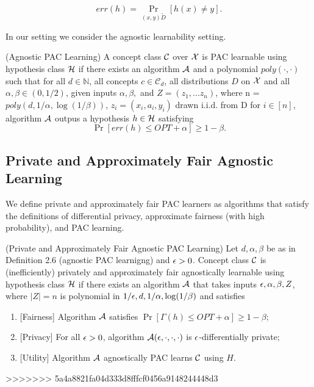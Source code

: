 $$err(h) = \Pr_{(x,y) \tilde D}[h(x) \neq y].$$

In our setting we consider the agnostic learnability setting.
\begin{defn}
	(Agnostic PAC Learning) A concept class $\mathcal{C}$ over $\mathcal{X}$ is PAC
  learnable using hypothesis class $\mathcal{H}$ if there exists an algorithm
  $\mathcal{A}$ and a polynomial $poly(\cdot,\cdot)$ such that for all $d \in
  \mathbb{N}$, all concepts $c \in \mathcal{C}_d$, all distributions
  $D$ on $\mathcal{X}$ and all $\alpha,\beta \in (0,1/2)$, given inputs
  $\alpha,\beta,$ and $Z = (z_1, ... z_n)$, where n = $poly(d,
  1/\alpha, \log(1/\beta))$, $z_i = (x_i, a_i, y_i)$ drawn i.i.d. from
  D for $i \in [n]$, algorithm $\mathcal{A}$ outpus a hypothesis $h \in \mathcal{H}$
  satisfying
	$$\Pr[err(h) \leq OPT + \alpha] \geq 1-\beta.$$

\end{defn}
\subsection{Private and Approximately Fair Agnostic Learning}
We define private and approximately fair PAC learners as algorithms that satisfy the definitions of differential privacy, approximate fairness (with high probability), and PAC learning.
\begin{defn}
	(Private and Approximately Fair Agnostic PAC Learning)
	Let $d, \alpha, \beta$ be as in Definition 2.6 (agnostic PAC
  learnigng) and $\epsilon > 0$. Concept class $\mathcal{C}$ is (inefficiently)
  privately and approximately fair agnostically learnable using
  hypothesis class $\mathcal{H}$ if there exists an algorithm $\mathcal{A}$ that takes
  inputs $\epsilon, \alpha, \beta, Z$, where $|Z|=n$ is polynomial in
  $1/\epsilon, d, 1/\alpha, \log(1/\beta)$ and satisfies
	\begin{enumerate}
		\item {[}Fairness{]} Algorithm $\mathcal{A}$ satisfies $\Pr[\Gamma(h) \leq
    OPT + \alpha] \geq 1-\beta$;
		\item {[}Privacy{]} For all $\epsilon>0$, algorithm $\mathcal{A}(\epsilon, \cdot, \cdot, \cdot)$ is $\epsilon$-differentially private;
		\item {[}Utility{]} Algorithm $\mathcal{A}$ agnostically PAC learns $\mathcal{C}$ using $H$.
	\end{enumerate}
\end{defn}
>>>>>>> 5a4a8821fa04d333d8fffcf0456a9148244448d3
